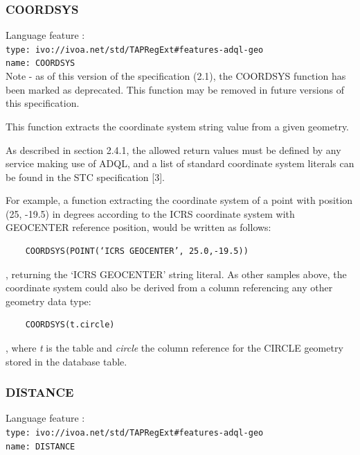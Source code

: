 \documentclass[11pt,a4paper]{ivoa}
\begin{document}
\subsubsection{COORDSYS}
\label{sec:geom.functions.coordsys}
{\footnotesize Language feature :}\\
{\footnotesize \verb|type: ivo://ivoa.net/std/TAPRegExt#features-adql-geo|}\\
{\footnotesize \verb|name: COORDSYS|}\\

Note - as of this version of the specification (2.1), the COORDSYS function has
been marked as deprecated. This function may be removed in future versions
of this specification.

This function extracts the coordinate system string value from a given
geometry.

As described in section 2.4.1, the allowed return values must be defined
by any service making use of ADQL, and a list of standard coordinate system
literals can be found in the STC specification [3].

For example, a function extracting the coordinate system of a point with
position (25, -19.5) in degrees according to the ICRS coordinate system with
GEOCENTER reference position, would be written as follows:

\begin{verbatim}
    COORDSYS(POINT(‘ICRS GEOCENTER’, 25.0,-19.5))
\end{verbatim}

, returning the ‘ICRS GEOCENTER’ string literal. As other samples above,
the coordinate system could also be derived from a column referencing any
other geometry data type:

\begin{verbatim}
    COORDSYS(t.circle)
\end{verbatim}

, where \textit{t} is the table and \textit{circle} the column reference
for the CIRCLE geometry stored in the database table.

\subsubsection{DISTANCE}
\label{sec:geom.functions.distance}
{\footnotesize Language feature :}\\
{\footnotesize \verb|type: ivo://ivoa.net/std/TAPRegExt#features-adql-geo|}\\
{\footnotesize \verb|name: DISTANCE|}\\
\end{document}
